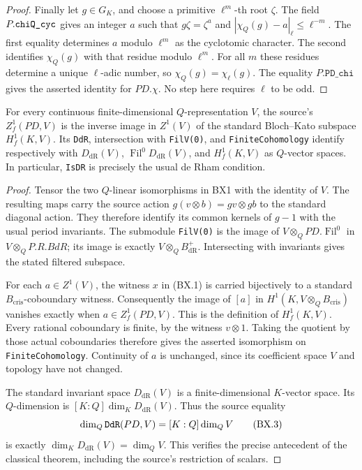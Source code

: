 \begin{proof}
Finally let $g\in G_K$, and choose a primitive $\ell^m$-th root
$\zeta$.  The field $P.\texttt{chi\allowbreak Q\_cyc}$ gives an integer $a$
such that $g\zeta=\zeta^a$ and
$|\chi_Q(g)-a|_\ell\le\ell^{-m}$.
The first equality determines $a$ modulo $\ell^m$ as the
cyclotomic character.  The second identifies $\chi_Q(g)$ with
that residue modulo $\ell^m$.  For all $m$ these residues
determine a unique $\ell$-adic number, so
$\chi_Q(g)=\chi_\ell(g)$.  The equality $P.\texttt{PD\_chi}$
gives the asserted identity for $PD.\chi$.
No step here requires $\ell$ to be odd.
\end{proof}

\begin{proposition}
\label{claim:BX2}
For every continuous finite-dimensional $Q$-representation $V$,
the source's $Z_f^1(PD,V)$ is the inverse image in $Z^1(V)$ of
the standard Bloch--Kato subspace $H_f^1(K,V)$.
Its \texttt{Dd\allowbreak R}, intersection with \texttt{Fil\allowbreak V(0)}, and
\texttt{Finite\allowbreak Cohomology} identify respectively with
$D_{\mathrm{dR}}(V)$, $\operatorname{Fil}^0D_{\mathrm{dR}}(V)$,
and $H_f^1(K,V)$ as $Q$-vector spaces.
In particular, \texttt{Is\allowbreak DR} is precisely the usual de Rham
condition.
\end{proposition}
\begin{proof}
Tensor the two $Q$-linear isomorphisms in BX1 with the identity
of $V$.  The resulting maps carry the source action
$g(v\otimes b)=gv\otimes gb$ to the standard diagonal action.
They therefore identify its common kernels of $g-1$ with the
usual period invariants.  The submodule \texttt{Fil\allowbreak V(0)} is the
image of $V\otimes_Q PD.\operatorname{Fil}^0$ in
$V\otimes_Q P.R.BdR$; its image is exactly
$V\otimes_Q B_{\mathrm{dR}}^+$.  Intersecting with invariants
gives the stated filtered subspace.

For each $a\in Z^1(V)$, the witness $x$ in (BX.1) is carried
bijectively to a standard $B_{\mathrm{cris}}$-coboundary witness.
Consequently the image of $[a]$ in
$H^1(K,V\otimes_Q B_{\mathrm{cris}})$ vanishes exactly when
$a\in Z_f^1(PD,V)$.  This is the definition of $H_f^1(K,V)$.
Every rational coboundary is finite, by the witness $v\otimes1$.
Taking the quotient by those actual coboundaries therefore
gives the asserted isomorphism on \texttt{Finite\allowbreak Cohomology}.
Continuity of $a$ is unchanged, since its coefficient space $V$
and topology have not changed.

The standard invariant space $D_{\mathrm{dR}}(V)$ is a
finite-dimensional $K$-vector space.  Its $Q$-dimension is
$[K:Q]\dim_KD_{\mathrm{dR}}(V)$.  Thus the source equality
\[
 \dim_Q\texttt{Dd\allowbreak R}(PD,V)=[K:Q]\dim_QV
                                                               \tag{BX.3}
\]
is exactly $\dim_KD_{\mathrm{dR}}(V)=\dim_QV$.
This verifies the precise antecedent of the classical theorem,
including the source's restriction of scalars.
\end{proof}

